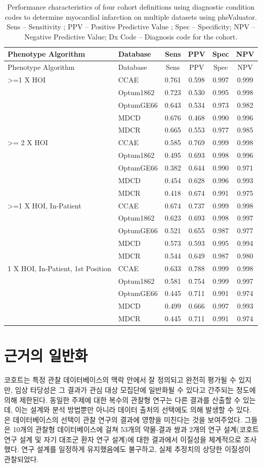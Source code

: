 \documentclass[11pt]{book}
\theoremstyle{definition}
\theoremstyle{definition}
\theoremstyle{definition}
\theoremstyle{remark}
\begin{document}
\begin{longtable}[]{@{}llcccc@{}}
\caption{\label{tab:phevalStats} Performance characteristics of four cohort
definitions using diagnostic condition codes to determine myocardial
infarction on multiple datasets using pheValuator. Sens -- Sensitivity ;
PPV -- Positive Predictive Value ; Spec -- Specificity; NPV -- Negative
Predictive Value; Dx Code -- Diagnosis code for the
cohort.}\tabularnewline
\toprule
Phenotype Algorithm & Database & Sens & PPV & Spec & NPV\tabularnewline
\midrule
\endfirsthead
\toprule
Phenotype Algorithm & Database & Sens & PPV & Spec & NPV\tabularnewline
\midrule
\endhead
\textgreater{}=1 X HOI & CCAE & 0.761 & 0.598 & 0.997 &
0.999\tabularnewline
& Optum1862 & 0.723 & 0.530 & 0.995 & 0.998\tabularnewline
& OptumGE66 & 0.643 & 0.534 & 0.973 & 0.982\tabularnewline
& MDCD & 0.676 & 0.468 & 0.990 & 0.996\tabularnewline
& MDCR & 0.665 & 0.553 & 0.977 & 0.985\tabularnewline
\textgreater{}= 2 X HOI & CCAE & 0.585 & 0.769 & 0.999 &
0.998\tabularnewline
& Optum1862 & 0.495 & 0.693 & 0.998 & 0.996\tabularnewline
& OptumGE66 & 0.382 & 0.644 & 0.990 & 0.971\tabularnewline
& MDCD & 0.454 & 0.628 & 0.996 & 0.993\tabularnewline
& MDCR & 0.418 & 0.674 & 0.991 & 0.975\tabularnewline
\textgreater{}=1 X HOI, In-Patient & CCAE & 0.674 & 0.737 & 0.999 &
0.998\tabularnewline
& Optum1862 & 0.623 & 0.693 & 0.998 & 0.997\tabularnewline
& OptumGE66 & 0.521 & 0.655 & 0.987 & 0.977\tabularnewline
& MDCD & 0.573 & 0.593 & 0.995 & 0.994\tabularnewline
& MDCR & 0.544 & 0.649 & 0.987 & 0.980\tabularnewline
1 X HOI, In-Patient, 1st Position & CCAE & 0.633 & 0.788 & 0.999 &
0.998\tabularnewline
& Optum1862 & 0.581 & 0.754 & 0.999 & 0.997\tabularnewline
& OptumGE66 & 0.445 & 0.711 & 0.991 & 0.974\tabularnewline
& MDCD & 0.499 & 0.666 & 0.997 & 0.993\tabularnewline
& MDCR & 0.445 & 0.711 & 0.991 & 0.974\tabularnewline
\bottomrule
\end{longtable}

\section{근거의 일반화}\label{GeneralizabilityOfEvidence}

코호트는 특정 관찰 데이터베이스의 맥락 안에서 잘 정의되고 완전히 평가될
수 있지만, 임상 타당성은 그 결과가 관심 대상 모집단에 일반화될 수 있다고
간주되는 정도에 의해 제한된다. 동일한 주제에 대한 복수의 관찰형 연구는
다른 결과를 산출할 수 있는데, 이는 설계와 분석 방법뿐만 아니라 데이터
출처의 선택에도 의해 발생할 수 있다. \citet{madigan_2013} 은
데이터베이스의 선택이 관찰 연구의 결과에 영향을 미친다는 것을
보여주었다. 그들은 10개의 관찰형 데이터베이스에 걸쳐 53개의 약물-결과
쌍과 2개의 연구 설계(코호트 연구 설계 및 자기 대조군 환자 연구 설계)에
대한 결과에서 이질성을 체계적으로 조사했다. 연구 설계를 일정하게
유지했음에도 불구하고, 실제 추정치의 상당한 이질성이 관찰되었다.
\end{document}
